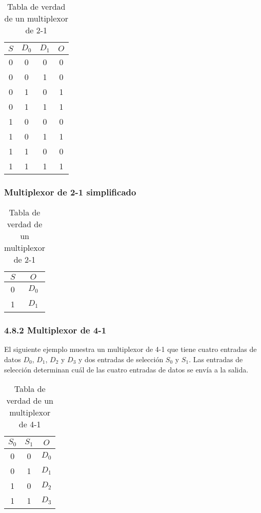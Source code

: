\begin{table}[h]
    \centering
    \begin{tabular}{c|cc|c}
        \toprule
        $S$ & $D_0$ & $D_1$ & $O$ \\
        \midrule
        0   & 0     & 0     & 0   \\
        0   & 0     & 1     & 0   \\
        0   & 1     & 0     & 1   \\
        0   & 1     & 1     & 1   \\
        1   & 0     & 0     & 0   \\
        1   & 0     & 1     & 1   \\
        1   & 1     & 0     & 0   \\
        1   & 1     & 1     & 1   \\
        \bottomrule
    \end{tabular}
    \caption{Tabla de verdad de un multiplexor de 2-1}
\end{table}

\subsubsection*{Multiplexor de 2-1 simplificado}

\begin{table}[h]
    \centering
    \begin{tabular}{c|c}
        \toprule
        $S$ & $O$   \\
        \midrule
        0   & $D_0$ \\
        1   & $D_1$ \\
        \bottomrule
    \end{tabular}
    \caption{Tabla de verdad de un multiplexor de 2-1}
\end{table}

\subsubsection*{4.8.2 Multiplexor de 4-1}
El siguiente ejemplo muestra un multiplexor de 4-1 que tiene cuatro entradas de datos $D_0$, $D_1$, $D_2$ y $D_3$ y dos entradas de
selecci\'{o}n $S_0$ y $S_1$. Las entradas de selecci\'{o}n determinan cu\'{a}l de las cuatro entradas de datos se env\'{i}a a la salida.

\begin{table}[h]
    \centering
    \begin{tabular}{cc|c}
        \toprule
        $S_0$ & $S_1$ & $O$   \\
        \midrule
        0     & 0     & $D_0$ \\
        0     & 1     & $D_1$ \\
        1     & 0     & $D_2$ \\
        1     & 1     & $D_3$ \\
        \bottomrule
    \end{tabular}
    \caption{Tabla de verdad de un multiplexor de 4-1}
\end{table}

